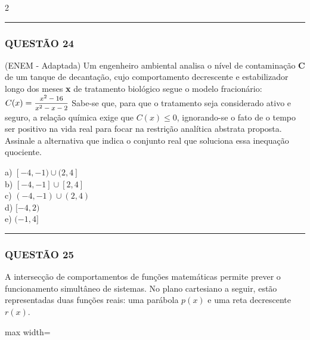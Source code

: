 \documentclass[twoside, 10pt, a4paper]{article}
\begin{document}
\begin{multicols*}{2}
\vspace{0cm} \noindent\textcolor{CorLinha}{\rule{\linewidth}{0.5pt}} \vspace{-0.2cm}
\subsubsection*{QUESTÃO 24}
(ENEM - Adaptada) Um engenheiro ambiental analisa o nível de contaminação \textbf{C} de um tanque de decantação, cujo comportamento decrescente e estabilizador longo dos meses \textbf{x} de tratamento biológico segue o modelo fracionário:
$ C(x) = \mfrac{x^2 - 16}{x^2 - x - 2} $
Sabe-se que, para que o tratamento seja considerado ativo e seguro, a relação química exige que $ C(x) \le 0 $, ignorando-se o fato de o tempo ser positivo na vida real para focar na restrição analítica abstrata proposta. Assinale a alternativa que indica o conjunto real que soluciona essa inequação quociente.

a) $ [-4, -1) \cup (2, 4] $\\[0.3cm]
b) $ [-4, -1] \cup [2, 4] $\\[0.3cm]
c) $ (-4, -1) \cup (2, 4) $\\[0.3cm]
d) $ [-4, 2) $\\[0.3cm]
e) $ (-1, 4] $

\vspace{0cm} \noindent\textcolor{CorLinha}{\rule{\linewidth}{0.5pt}} \vspace{-0.2cm}
\subsubsection*{QUESTÃO 25}
A intersecção de comportamentos de funções matemáticas permite prever o funcionamento simultâneo de sistemas. No plano cartesiano a seguir, estão representadas duas funções reais: uma parábola $ p(x) $ e uma reta decrescente $ r(x) $.

\begin{center}
\begin{adjustbox}{max width=\linewidth}
\end{adjustbox}
\end{center}
\end{multicols*}
\end{document}
